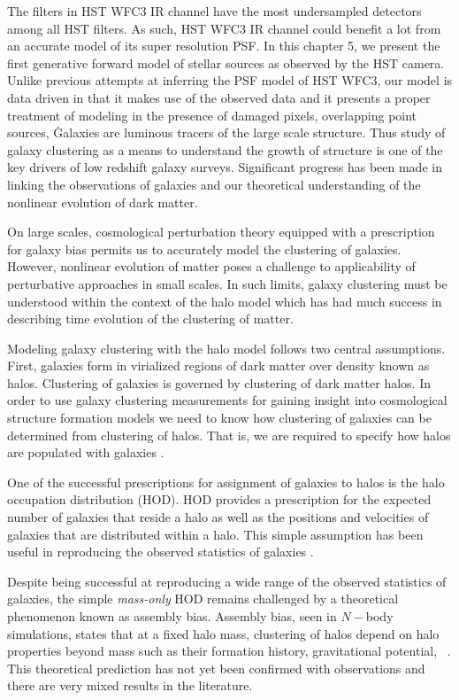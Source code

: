 The filters in HST WFC3 IR channel have the most undersampled detectors among all HST filters. 
As such, HST WFC3 IR channel could benefit a lot from an accurate model of its super resolution PSF. 
In this chapter 5, we present the first generative forward model of stellar sources as observed by the HST camera.
Unlike previous attempts at inferring the PSF model of HST WFC3, our model is data driven in that it makes 
use of the observed data and it presents a proper treatment of modeling in the presence of damaged pixels, overlapping 
point sources, \etc\.  

Galaxies are luminous tracers of the large scale structure. Thus study of galaxy clustering as a means to understand the growth of structure is 
one of the key drivers of low redshift galaxy surveys. Significant progress has been made in linking the observations of 
galaxies and our theoretical understanding of the nonlinear evolution of dark matter. 

On large scales, cosmological perturbation theory equipped with a prescription for galaxy bias permits us 
to accurately model the clustering of galaxies. However, nonlinear evolution of matter 
poses a challenge to applicability of perturbative approaches in small scales. In such limits, 
galaxy clustering must be understood within the context of the halo model which has had 
much success in describing time evolution of the clustering of matter.  

Modeling galaxy clustering with the halo model follows two central assumptions. First, galaxies form in virialized regions of 
dark matter over density known as halos. Clustering of galaxies is governed by clustering of dark matter halos. 
In order to use galaxy clustering measurements for gaining insight into cosmological structure formation models we need to 
know how clustering of galaxies can be determined from clustering of halos. That is, we are required to specify how halos 
are populated with galaxies \citep{seljak2000,scoccimarro2001,berlind_weinberg2002}.

One of the successful prescriptions for assignment of galaxies to halos is the halo occupation distribution (HOD). 
HOD provides a prescription for the expected number of galaxies that reside a halo as well as 
the positions and velocities of galaxies that are distributed within a halo. This simple assumption has been useful 
in reproducing the observed statistics of galaxies \citep{tinker_rsd2007,zehavi2011,zheng_guo}.

Despite being successful at reproducing a wide range of the observed statistics of galaxies, the simple \emph{mass-only} HOD 
remains challenged by a theoretical phenomenon known as assembly bias. Assembly bias, seen in $N-$body simulations, states that at a fixed halo mass, clustering 
of halos depend on halo properties beyond mass such as their formation history, gravitational potential, \etc\ \citep{weschler2006,gao2007,arz2014,sunayama2016}.
This theoretical prediction has not yet been confirmed with observations and there are very mixed results in the literature.

